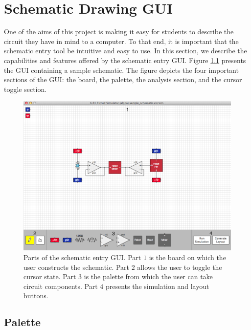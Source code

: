
\chapter{Schematic Drawing GUI}
\label{app:gui}

One of the aims of this project is making it easy for students to describe the
circuit they have in mind to a computer. To that end, it is important that the
schematic entry tool be intuitive and easy to use. In this section, we
describe the capabilities and features offered by the schematic entry GUI.
Figure \ref{fig:gui} presents the GUI containing a sample
schematic. The figure depicts the four important sections of the GUI: the board,
the palette, the analysis section, and the cursor toggle section.

\begin{figure}
\begin{center}
\includegraphics[width=\textwidth]{Images/gui.png}
\caption[Schematic entry GUI parts]{Parts of the schematic entry GUI. Part $1$
is the board on which the user constructs the schematic. Part $2$ allows the
user to toggle the cursor state. Part $3$ is the palette from which the user can
take circuit components. Part $4$ presents the simulation and layout buttons.}
\label{fig:gui}
\end{center}
\end{figure}

\section{Palette}

